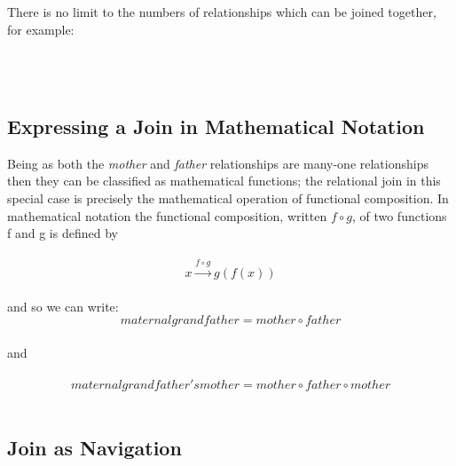\begin{equation}
\label{maternalgrandfather}
\raisebox{-0.95cm}{

}
\end{equation}

\noindent There is no limit to the numbers of relationships which can be joined together, for example:\\

\begin{equation}
\label{maternalgrandfathersmother}
\raisebox{-1.15cm}{

}
\end{equation}

\subsection{Expressing a Join in Mathematical Notation}
\noindent Being as both the \textit{mother} and \textit{father} relationships are many-one relationships then they can be classified as mathematical functions; the relational join in this special case is precisely the mathematical operation of functional composition. In mathematical notation the functional composition, written $f \circ g$, of two functions f and g is defined by \\
 \\
\begin{equation}
x \stackrel{f \circ g}{\rightarrow} g(f(x))
\end{equation} 
 \\
and so we can write:
\begin{equation}
maternalgrandfather = mother \circ father
\end{equation}
 \\
and \\
 \\
\begin{equation}
maternalgrandfather's mother = mother \circ father \circ mother
\end{equation}
 \\
\subsection {Join as Navigation}

